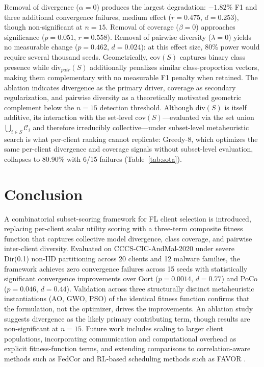 \documentclass[conference]{IEEEtran}
\begin{document}
Removal of divergence ($\alpha{=}0$) produces the largest degradation: $-1.82\%$ F1 and three additional convergence failures, medium effect ($r=0.475$, $d=0.253$), though non-significant at $n=15$. Removal of coverage ($\beta{=}0$) approaches significance ($p=0.051$, $r=0.558$). Removal of pairwise diversity ($\lambda{=}0$) yields no measurable change ($p=0.462$, $d=0.024$): at this effect size, 80\% power would require several thousand seeds. Geometrically, $\text{cov}(S)$ captures binary class presence while $\text{div}_{pair}(S)$ additionally penalizes similar class-proportion vectors, making them complementary with no measurable F1 penalty when retained. The ablation indicates divergence as the primary driver, coverage as secondary regularization, and pairwise diversity as a theoretically motivated geometric complement below the $n=15$ detection threshold. Although $\text{div}(S)$ is itself additive, its interaction with the set-level $\text{cov}(S)$---evaluated via the set union $\bigcup_{i\in S}\mathcal{C}_i$ and therefore irreducibly collective---under subset-level metaheuristic search is what per-client ranking cannot replicate: Greedy-8, which optimizes the same per-client divergence and coverage signals without subset-level evaluation, collapses to 80.90\% with 6/15 failures (Table~\ref{tab:sota}).


\section{Conclusion}

A combinatorial subset-scoring framework for FL client selection is introduced, replacing per-client scalar utility scoring with a three-term composite fitness function that captures collective model divergence, class coverage, and pairwise inter-client diversity. Evaluated on CCCS-CIC-AndMal-2020 under severe Dir(0.1) non-IID partitioning across 20 clients and 12 malware families, the framework achieves zero convergence failures across 15 seeds with statistically significant convergence improvements over Oort ($p=0.0014$, $d=0.77$) and PoCo ($p=0.046$, $d=0.44$). Validation across three structurally distinct metaheuristic instantiations (AO, GWO, PSO) of the identical fitness function confirms that the formulation, not the optimizer, drives the improvements. An ablation study suggests divergence as the likely primary contributing term, though results are non-significant at $n=15$. Future work includes scaling to larger client populations, incorporating communication and computational overhead as explicit fitness-function terms, and extending comparisons to correlation-aware methods such as FedCor \cite{tang2022fedcor} and RL-based scheduling methods such as FAVOR \cite{wang2020favor}.
\end{document}
